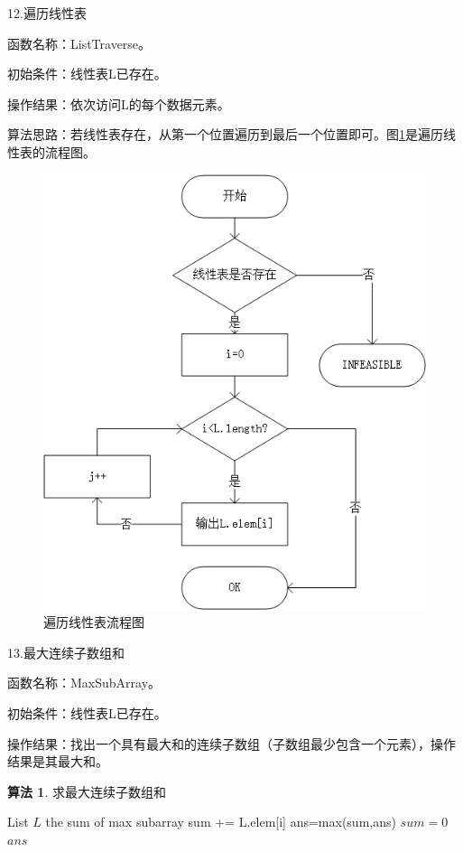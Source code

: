 \documentclass[supercite]{Experimental_Report}
\theoremstyle{definition}
\newtheorem{alg}{算法}[section]
\begin{document}
\newpage

12.遍历线性表

函数名称：ListTraverse。

初始条件：线性表L已存在。

操作结果：依次访问L的每个数据元素。

算法思路：若线性表存在，从第一个位置遍历到最后一个位置即可。图\ref{fig1-12}是遍历线性表的流程图。
\begin{figure}[htb] %
	\begin{center}
		\includegraphics[scale=0.9]{./images/顺序表/traverse.jpg}
		\caption{遍历线性表流程图}
		\label{fig1-12}
	\end{center}
\end{figure}

13.最大连续子数组和

函数名称：MaxSubArray。

初始条件：线性表L已存在。

操作结果：找出一个具有最大和的连续子数组（子数组最少包含一个元素），操作结果是其最大和。

\begin{shaded*}\begin{alg}{求最大连续子数组和}
	\label{alg:1}
	\begin{algorithmic}
		\Input List $L$
		\Output the sum of max subarray
		\State sum += L.elem[i]
		\State ans=max(sum,ans)
		\State $sum = 0$
		\EndIf
		\EndFor
		\State \Return $ans$
		\EndProcedure
	\end{algorithmic}
\end{alg}\end{shaded*}
\end{document}
